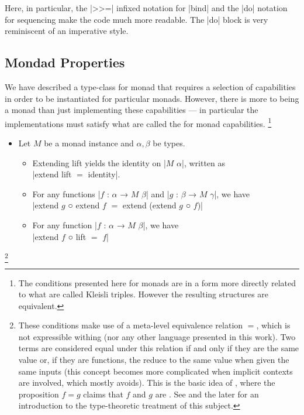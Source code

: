 Here, in particular,
the \code|>>=| infixed notation for \code|bind| and
the \code|do| notation for sequencing make the code much more readable.
The \code|do| block is very reminiscent of an imperative style.



\newpage
\subsection{Mondad Properties}

We have described a type-class for monad that requires a selection of capabilities in order to be instantiated for particular monads.
However, there is more to being a monad than just implementing these capabilities --- in particular the implementations must satisfy what are called the  for monad capabilities.%
\footnote{
  The conditions presented here for monads are in a form more directly related to what are called Kleisli triples.
  However the resulting structures are equivalent.
}

\begin{table}[h]
\begin{itemize}
\item[]
Let $M$ be a monad instance and $α, β$ be types.
\begin{itemize}
  \item
    Extending lift yields the identity on \code|$M$ $α$|, written as \\
    \code|extend lift $=$ identity|.
  \item
    For any functions \code|$f$ : $α$ → $M$ $β$| and \code|$g$ : $β$ → $M$ $γ$|, we have \\
    \code|extend $g$ ○ extend $f$ $=$ extend (extend $g$ ○ $f$)|
  \item
    For any function \code|$f$ : $α$ → $M$ $β$|, we have \\
    \code|extend $f$ ○ lift $=$ $f$|
\end{itemize}
\end{itemize}
\end{table}%
\footnote{
  These conditions make use of a meta-level equivalence relation $=$, which is not expressible withing \LangC (nor any other language presented in this work).
  Two terms are considered equal under this relation if and only if they are the same value or, if they are functions, the reduce to the same value when given the same inputs (this concept becomes more complicated when implicit contexts are involved, which \LangC mostly avoids).
  This is the basic idea of , where the proposition $f = g$ claims that $f$ and $g$ are .
  See \cite{Awodey2004} and the later \cite{Wadler2015} for an introduction to the type-theoretic treatment of this subject.
}

